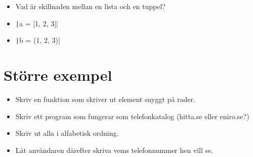 \begin{frame}[fragile]
  \begin{example}[fullname.py]
    \inputminted[firstline=3,lastline=7]{python}{examples/fullname.py}
  \end{example}

  \pause

  \begin{example}
    \inputminted[firstline=3,lastline=7,highlightlines=7]{python}{examples/fullname-alt.py}
  \end{example}
\end{frame}

\begin{frame}[fragile]
  \begin{exercise}
    \begin{itemize}
      \item Vad är skillnaden mellan en lista och en tuppel?
      \item \texttt|a = [1, 2, 3]|
      \item \texttt|b = (1, 2, 3)|
    \end{itemize}
  \end{exercise}
\end{frame}


\section{Större exempel}

\begin{frame}
  \begin{exercise}
    \begin{itemize}
      \item Skriv en funktion som skriver ut element snyggt på rader.
    \end{itemize}
  \end{exercise}
\end{frame}

\begin{frame}
  \begin{exercise}
    \begin{itemize}
      \item Skriv ett program som fungerar som telefonkatalog (hitta.se eller 
        eniro.se?)
      \item Skriv ut alla i alfabetisk ordning.
      \item Låt användaren därefter skriva vems telefonnummer hen vill se.
    \end{itemize}
  \end{exercise}
\end{frame}

